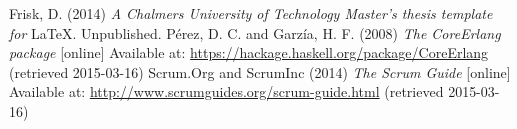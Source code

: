 \begin{thebibliography}{69}

 Frisk, D. (2014) \textit{A Chalmers University of Technology Master's thesis template for} \LaTeX . Unpublished.
 Pérez, D. C. and Garzía, H. F. (2008) \textit{The CoreErlang package} [online] Available at: \url{https://hackage.haskell.org/package/CoreErlang} (retrieved 2015-03-16)
 Scrum.Org and ScrumInc (2014) \textit{The Scrum Guide} [online] Available at: \url{http://www.scrumguides.org/scrum-guide.html} (retrieved 2015-03-16)

\end{thebibliography}

